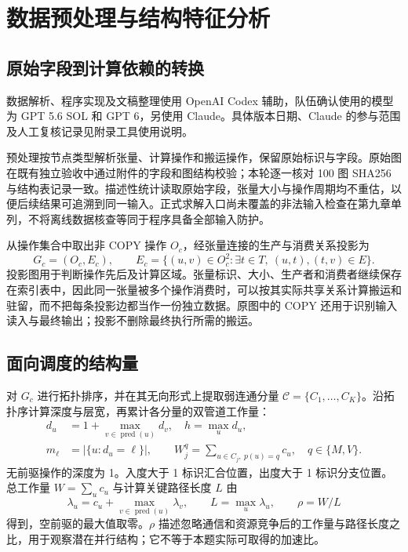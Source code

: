 \section{数据预处理与结构特征分析}

\subsection{原始字段到计算依赖的转换}
数据解析、程序实现及文稿整理使用 OpenAI Codex 辅助，队伍确认使用的模型为 GPT 5.6 SOL 和 GPT 6，另使用 Claude\cite{AICodex,AIClaude}。具体版本日期、Claude 的参与范围及人工复核记录见附录工具使用说明。

预处理按节点类型解析张量、计算操作和搬运操作，保留原始标识与字段。原始图在既有独立验收中通过附件的字段和图结构校验；本轮逐一核对 100 图 SHA256 与结构表记录一致。描述性统计读取原始字段，张量大小与操作周期均不重估，以便后续结果可追溯到同一输入。正式求解入口尚未覆盖的非法输入检查在第九章单列，不将离线数据核查等同于程序具备全部输入防护。

从操作集合中取出非 COPY 操作 $O_c$，经张量连接的生产与消费关系投影为
\begin{equation}
G_c=(O_c,E_c),\qquad
E_c=\{(u,v)\in O_c^2:\exists t\in T,\ (u,t),(t,v)\in E\}.
\label{eq:q1-opgraph}
\end{equation}
投影图用于判断操作先后及计算区域。张量标识、大小、生产者和消费者继续保存在索引表中，因此同一张量被多个操作消费时，可以按其实际共享关系计算搬运和驻留，而不把每条投影边都当作一份独立数据。原图中的 COPY 还用于识别输入读入与最终输出；投影不删除最终执行所需的搬运。

\subsection{面向调度的结构量}
对 $G_c$ 进行拓扑排序，并在其无向形式上提取弱连通分量 $\mathcal C=\{C_1,\ldots,C_K\}$。沿拓扑序计算深度与层宽，再累计各分量的双管道工作量：
\begin{equation}
\begin{aligned}
d_u&=1+\max_{v\in\operatorname{pred}(u)}d_v,\quad h=\max_u d_u,\\
m_\ell&=|\{u:d_u=\ell\}|,\qquad
W_j^q=\sum_{u\in C_j,\ p(u)=q}c_u,\quad q\in\{M,V\}.
\end{aligned}
\label{eq:q1-features}
\end{equation}
无前驱操作的深度为 1。入度大于 1 标识汇合位置，出度大于 1 标识分支位置。总工作量 $W=\sum_u c_u$ 与计算关键路径长度 $L$ 由
\begin{equation}
\lambda_u=c_u+\max_{v\in\operatorname{pred}(u)}\lambda_v,\qquad
L=\max_u\lambda_u,\qquad \rho=W/L
\label{eq:span}
\end{equation}
得到，空前驱的最大值取零。$\rho$ 描述忽略通信和资源竞争后的工作量与路径长度之比，用于观察潜在并行结构；它不等于本题实际可取得的加速比。

